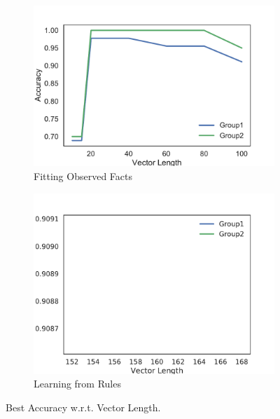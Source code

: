 \begin{figure}[!]
    \centering
    \begin{subfigure}[]{0.5\textwidth}
        \includegraphics[width=\textwidth]{img/curve3.pdf}
        \caption{Fitting Observed Facts}
        \label{fig:sensitive-best-accuracy-1}
    \end{subfigure}

    \begin{subfigure}[]{0.5\textwidth}
        \includegraphics[width=\textwidth]{img/curve4.pdf}
        \caption{Learning from Rules }
        \label{fig:sensitive-best-accuracy-2}
    \end{subfigure}
    \caption{Best Accuracy w.r.t. Vector Length.}
    \label{fig:sensitive}
\end{figure}

